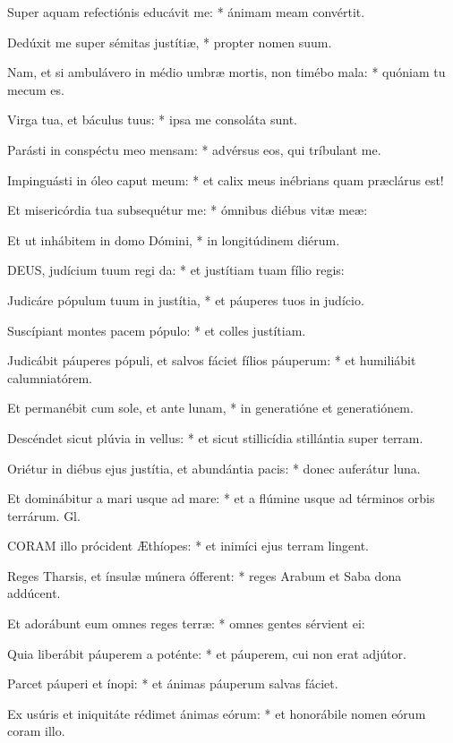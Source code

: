 Super aquam refectiónis educávit me: * ánimam meam convértit.

Dedúxit me super sémitas justítiæ, * propter nomen suum.

Nam, et si ambulávero in médio umbræ mortis, non timébo mala: * quóniam tu mecum es.

Virga tua, et báculus tuus: * ipsa me consoláta sunt.

Parásti in conspéctu meo mensam: * advérsus eos, qui tríbulant me.

Impinguásti in óleo caput meum: * et calix meus inébrians quam præclárus est!

Et misericórdia tua subsequétur me: * ómnibus diébus vitæ meæ:

Et ut inhábitem in domo Dómini, * in longitúdinem diérum.


\lettrine[lines=2]{D}{EUS}, judícium tuum regi da: * et justítiam tuam fílio regis:

Judicáre pópulum tuum in justítia, * et páuperes tuos in judício.

Suscípiant montes pacem pópulo: * et colles justítiam.

Judicábit páuperes pópuli, et salvos fáciet fílios páuperum: * et humiliábit calumniatórem.

Et permanébit cum sole, et ante lunam, * in generatióne et generatiónem.

Descéndet sicut plúvia in vellus: * et sicut stillicídia stillántia super terram.

Oriétur in diébus ejus justítia, et abundántia pacis: * donec auferátur luna.

Et dominábitur a mari usque ad mare: * et a flúmine usque ad términos orbis terrárum. Gl.


\lettrine[lines=2]{C}{ORAM} illo prócident Æthíopes: * et inimíci ejus terram lingent.

Reges Tharsis, et ínsulæ múnera ófferent: * reges Arabum et Saba dona addúcent.

Et adorábunt eum omnes reges terræ: * omnes gentes sérvient ei:

Quia liberábit páuperem a poténte: * et páuperem, cui non erat adjútor.

Parcet páuperi et ínopi: * et ánimas páuperum salvas fáciet.

Ex usúris et iniquitáte rédimet ánimas eórum: * et honorábile nomen eórum coram illo.

